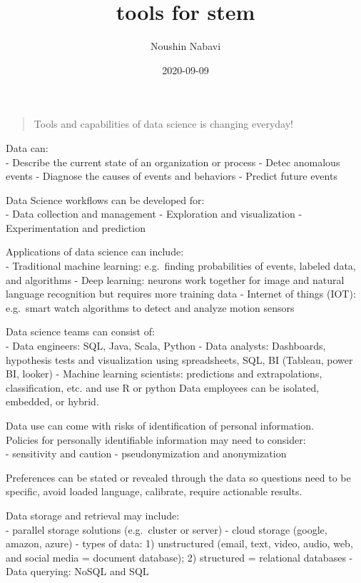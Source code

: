 \documentclass[]{book}
\title{tools for stem}
\author{Noushin Nabavi}
\date{2020-09-09}
\begin{document}
\maketitle

{
\setcounter{tocdepth}{1}
\tableofcontents
}
\begin{quote}
Tools and capabilities of data science is changing everyday!
\end{quote}

Data can:\\
- Describe the current state of an organization or process
- Detec anomalous events
- Diagnose the causes of events and behaviors
- Predict future events

Data Science workflows can be developed for:\\
- Data collection and management
- Exploration and visualization
- Experimentation and prediction

Applications of data science can include:\\
- Traditional machine learning: e.g.~finding probabilities of events, labeled data, and algorithms
- Deep learning: neurons work together for image and natural language recognition but requires more training data
- Internet of things (IOT): e.g.~smart watch algorithms to detect and analyze motion sensors

Data science teams can consist of:\\
- Data engineers: SQL, Java, Scala, Python
- Data analysts: Dashboards, hypothesis tests and visualization using spreadsheets, SQL, BI (Tableau, power BI, looker)
- Machine learning scientists: predictions and extrapolations, classification, etc. and use R or python
Data employees can be isolated, embedded, or hybrid.

Data use can come with risks of identification of personal information.\\
Policies for personally identifiable information may need to consider:\\
- sensitivity and caution
- pseudonymization and anonymization

Preferences can be stated or revealed through the data so questions need to be specific, avoid loaded language, calibrate, require actionable results.

Data storage and retrieval may include:\\
- parallel storage solutions (e.g.~cluster or server)
- cloud storage (google, amazon, azure)
- types of data: 1) unstructured (email, text, video, audio, web, and social media = document database); 2) structured = relational databases
- Data querying: NoSQL and SQL
\end{document}
